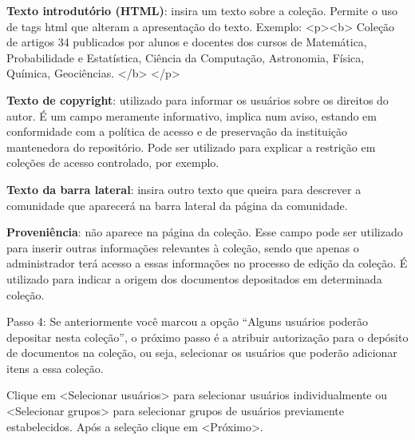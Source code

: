 \documentclass[12pt,hidelinks]{article}
\begin{document}
    \singlespacing
     
    \textbullet \hspace{6pt} \textbf{Texto introdutório (HTML)}: insira um texto sobre a coleção. Permite o uso de tags html que alteram a apresentação do texto. Exemplo: <p><b> Coleção de artigos 34 publicados por alunos e docentes dos cursos de Matemática, Probabilidade e Estatística, Ciência da Computação, Astronomia, Física, Química, Geociências. </b> </p>
    
    \singlespacing
     
    \textbullet \hspace{6pt} \textbf{Texto de copyright}: utilizado para informar os usuários sobre os direitos do autor. É um campo meramente informativo, implica num aviso, estando em conformidade com a política de acesso e de preservação da instituição mantenedora do repositório. Pode ser utilizado para explicar a restrição em coleções de acesso controlado, por exemplo.
    
    \singlespacing
     
    \textbullet \hspace{6pt} \textbf{Texto da barra lateral}: insira outro texto que queira para descrever a comunidade que aparecerá na barra lateral da página da comunidade.
    
    \singlespacing
     
    \textbullet \hspace{6pt} \textbf{Proveniência}: não aparece na página da coleção. Esse campo pode ser utilizado para inserir outras informações relevantes à coleção, sendo que apenas o administrador terá acesso a essas informações no processo de edição da coleção. É utilizado para indicar a origem dos documentos depositados em determinada coleção.
    
    Passo 4: Se anteriormente você marcou a opção “Alguns usuários poderão depositar nesta coleção”, o próximo passo é a atribuir autorização para o depósito de documentos na coleção, ou seja, selecionar os usuários que poderão adicionar itens a essa coleção.
    
    Clique em <Selecionar usuários> para selecionar usuários individualmente ou <Selecionar grupos> para selecionar grupos de usuários previamente estabelecidos. Após a seleção clique em <Próximo>.
    
\end{document}
